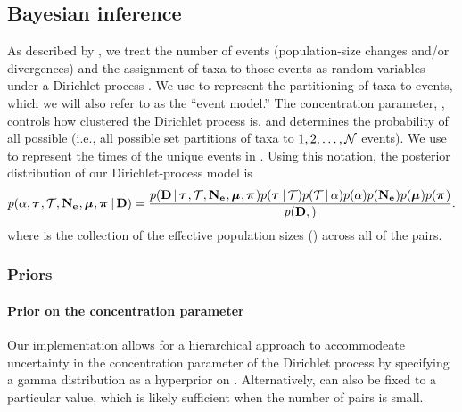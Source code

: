 \subsection{Bayesian inference}

\begin{linenomath}
As described by \citet{Oaks2018ecoevolity},
we treat the number of events (population-size changes and/or divergences)
and the assignment of taxa to those events as
random variables under a Dirichlet process \citep{Ferguson1973,
    Antoniak1974}.
We use \etimesets to represent the partitioning of taxa to events,
which we will also refer to as the ``event model.''
The concentration parameter, \concentration, controls how clustered the
Dirichlet process is, and determines the probability of all possible \etimesets
(i.e., all possible set partitions of taxa to $1, 2, \ldots, \mathcal{N}$ events).
We use \etimes to represent the times of the unique events in \etimesets.
Using this notation, the posterior distribution of our 
Dirichlet-process model is
\begin{equation}
    \pr(
    \concentration,
    \etimes,
    \etimesets,
    \collectionpopsizes,
    \murates,
    \gfreqs
    \given
    \alldata
    )
    =
    \frac{
        \pr(
        \alldata
        \given
        \etimes,
        \etimesets,
        \collectionpopsizes,
        \murates,
        \gfreqs
        )
        \pr(\etimes \given \etimesets)%
        \pr(\etimesets \given \concentration)
        \pr(\concentration)
        \pr(\collectionpopsizes)
        \pr(\murates)
        \pr(\gfreqs)
    }{
        \pr(
        \alldata,
        )
    }.
    \label{eq:bayesruleexpanded}
\end{equation}
where
\collectionpopsizes
is the collection of the effective population sizes (\comparisonpopsizes{})
across all of the pairs.
\end{linenomath}

\subsubsection{Priors}

\paragraph{Prior on the concentration parameter}
Our implementation allows for a hierarchical approach to accommodeate
uncertainty in the concentration parameter of the Dirichlet process
by specifying a gamma distribution as a hyperprior on
\concentration \citep{Escobar1995,Heath2011}.
Alternatively, \concentration can also be fixed to a particular value,
which is likely sufficient when the number of pairs is small.

